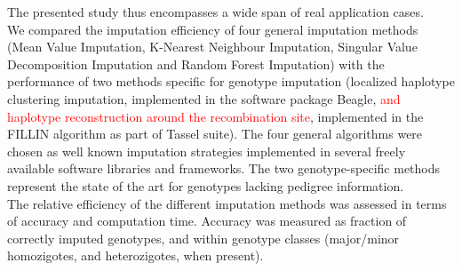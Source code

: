 The presented study thus encompasses a wide span of real application cases.\\
We compared the imputation efficiency of four general imputation methods (Mean
Value Imputation, K-Nearest Neighbour Imputation, Singular Value Decomposition
Imputation and Random Forest Imputation) with the performance of two methods specific 
for genotype imputation (localized haplotype clustering imputation, 
implemented in the software package Beagle, \textcolor{red}{and haplotype
reconstruction around the recombination site}, implemented in the FILLIN algorithm
as part of Tassel suite). The four general algorithms were chosen as well known imputation strategies implemented in several freely available software libraries and frameworks. The two genotype-specific methods represent the state of the art for genotypes lacking pedigree information.\\
The relative efficiency of the different imputation methods was assessed in terms of 
accuracy and computation time. Accuracy was measured as fraction of 
correctly imputed genotypes, and within genotype classes 
(major/minor homozigotes, and heterozigotes, when present).

